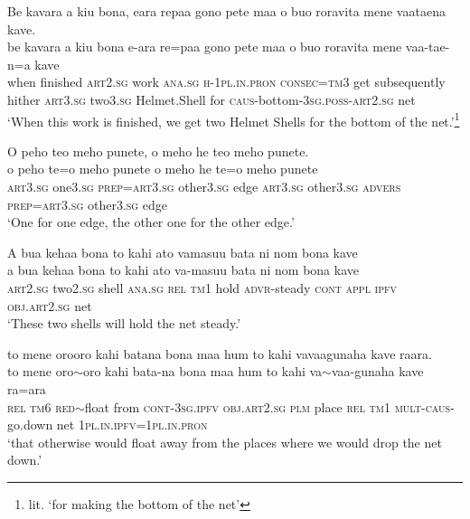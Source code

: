 \ea\label{ex:text20-27}
Be kavara a kiu bona, eara repaa gono pete maa o buo roravita mene vaataena kave.\\
\gll be	kavara	a	kiu	bona	e-ara	re=paa	gono	pete	maa	o	buo	roravita	mene	vaa-tae-n=a	kave\\
     when	finished	\textsc{art}2.\textsc{sg}	work	\textsc{ana}.\textsc{sg}	\textsc{h}-1\textsc{pl}.\textsc{in}.\textsc{pron}	\textsc{consec}=\textsc{tm}3	get	subsequently	hither	\textsc{art}3.\textsc{sg}	two3.\textsc{sg}	Helmet.Shell	for	\textsc{caus}-bottom-3\textsc{sg}.\textsc{poss}-\textsc{art}2.\textsc{sg}	net\\
\glt `When this work is finished, we get two Helmet Shells for the bottom of the net.'\footnote{lit. `for making the bottom of the net'}
\z

\ea\label{ex:text20-28}
O peho teo meho punete, o meho he teo meho punete.\\
\gll o	peho	te=o	meho	punete	o	meho	he	te=o	meho	punete\\
     \textsc{art}3.\textsc{sg}	one3.\textsc{sg}	\textsc{prep}=\textsc{art}3.\textsc{sg}	other3.\textsc{sg}	edge	\textsc{art}3.\textsc{sg}	other3.\textsc{sg}	\textsc{advers}	\textsc{prep}=\textsc{art}3.\textsc{sg}	other3.\textsc{sg}	edge\\
\glt `One for one edge, the other one for the other edge.'
\z

\newpage
\ea\label{ex:text20-29}
A bua kehaa bona to kahi ato vamasuu bata ni nom bona kave\\
\gll a	bua	kehaa	bona	to	kahi	ato	va-masuu	bata	ni	nom	bona	kave\\
     \textsc{art}2.\textsc{sg}	two2.\textsc{sg}	shell	\textsc{ana}.\textsc{sg}	\textsc{rel}	\textsc{tm}1	hold	\textsc{advr}-steady	\textsc{cont}	\textsc{appl}	\textsc{ipfv}	\textsc{obj}.\textsc{art}2.\textsc{sg}	net\\
\glt `These two shells will hold the net steady.'
\z

\ea\label{ex:text20-30}
to mene orooro kahi batana bona maa hum to kahi vavaagunaha kave raara.\\
\gll to	mene	oro{$\sim$}oro	kahi	bata-na	bona	maa	hum	to	kahi	va{$\sim$}vaa-gunaha	kave	ra=ara\\
     \textsc{rel}	\textsc{tm}6	\textsc{red}{$\sim$}float	from	\textsc{cont}-3\textsc{sg}.\textsc{ipfv}	\textsc{obj}.\textsc{art}2.\textsc{sg}	\textsc{plm}	place	\textsc{rel}	\textsc{tm}1	\textsc{mult}-\textsc{caus}-go.down	net	1\textsc{pl}.\textsc{in}.\textsc{ipfv}=1\textsc{pl}.\textsc{in}.\textsc{pron}\\
\glt `that otherwise would float away from the places where we would drop the net down.'
\z

